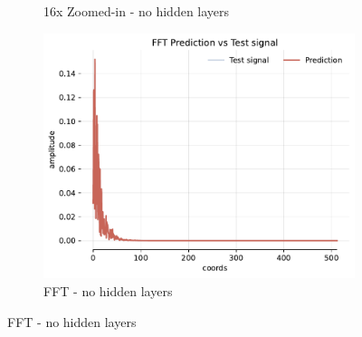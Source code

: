 \begin{figure}[!h]
\begin{subfigure}[b]{0.32\textwidth}
        \caption{16x Zoomed-in - no hidden layers}
    \end{subfigure}
    \begin{subfigure}[b]{0.32\textwidth}
        \centering
        \includegraphics[width=\textwidth]{img/ch3/fft-2048hf-0hl-96w-filter3.pdf}
        \caption{FFT - no hidden layers}
    \end{subfigure}


\end{figure}
